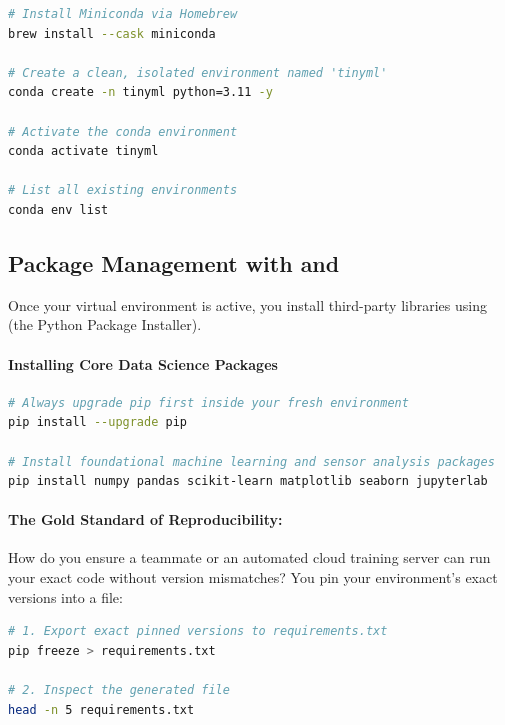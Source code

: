 \begin{lstlisting}[language=bash]
# Install Miniconda via Homebrew
brew install --cask miniconda

# Create a clean, isolated environment named 'tinyml'
conda create -n tinyml python=3.11 -y

# Activate the conda environment
conda activate tinyml

# List all existing environments
conda env list
\end{lstlisting}

\subsection{Package Management with  and }

Once your virtual environment is active, you install third-party libraries using \textbf{} (the Python Package Installer).

\paragraph{Installing Core Data Science Packages}
\begin{lstlisting}[language=bash]
# Always upgrade pip first inside your fresh environment
pip install --upgrade pip

# Install foundational machine learning and sensor analysis packages
pip install numpy pandas scikit-learn matplotlib seaborn jupyterlab
\end{lstlisting}

\paragraph{The Gold Standard of Reproducibility: }
How do you ensure a teammate or an automated cloud training server can run your exact code without version mismatches? You pin your environment's exact versions into a  file:

\begin{lstlisting}[language=bash]
# 1. Export exact pinned versions to requirements.txt
pip freeze > requirements.txt

# 2. Inspect the generated file
head -n 5 requirements.txt
\end{lstlisting}

